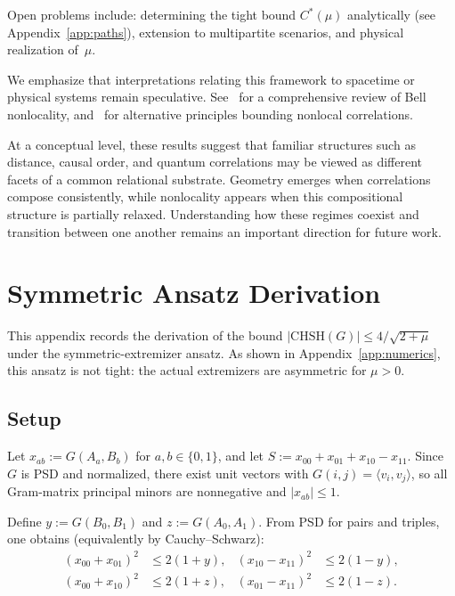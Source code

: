 \documentclass[11pt,a4paper]{article}
\theoremstyle{definition}
\theoremstyle{remark}
\newcommand{\CHSH}{\mathrm{CHSH}}
\newcommand{\ip}[2]{\langle #1, #2 \rangle}
\begin{document}
\noindent Open problems include: determining the tight bound $C^*(\mu)$ analytically (see Appendix~\ref{app:paths}), extension to multipartite scenarios, and physical realization of~$\mu$.

We emphasize that interpretations relating this framework to spacetime or physical systems remain speculative. See~\cite{brunner2014} for a comprehensive review of Bell nonlocality, and~\cite{pawlowski2009,carmi2019,grothendieck2006} for alternative principles bounding nonlocal correlations.

At a conceptual level, these results suggest that familiar structures such as distance, causal order, and quantum correlations may be viewed as different facets of a common relational substrate. Geometry emerges when correlations compose consistently, while nonlocality appears when this compositional structure is partially relaxed. Understanding how these regimes coexist and transition between one another remains an important direction for future work.


\appendix

\section{Symmetric Ansatz Derivation}\label{app:proof}

This appendix records the derivation of the bound $|\CHSH(G)| \le 4/\sqrt{2+\mu}$ under the symmetric-extremizer ansatz. As shown in Appendix~\ref{app:numerics}, this ansatz is not tight: the actual extremizers are asymmetric for $\mu > 0$.

\subsection{Setup}

Let $x_{ab} := G(A_a,B_b)$ for $a,b \in \{0,1\}$, and let $S := x_{00}+x_{01}+x_{10}-x_{11}$. Since~$G$ is PSD and normalized, there exist unit vectors with $G(i,j) = \ip{v_i}{v_j}$, so all Gram-matrix principal minors are nonnegative and $|x_{ab}| \le 1$.

Define $y := G(B_0,B_1)$ and $z := G(A_0,A_1)$. From PSD for pairs and triples, one obtains (equivalently by Cauchy--Schwarz):
\begin{align}
(x_{00}+x_{01})^2 &\le 2(1+y), & (x_{10}-x_{11})^2 &\le 2(1-y), \label{eq:psd-y}\\
(x_{00}+x_{10})^2 &\le 2(1+z), & (x_{01}-x_{11})^2 &\le 2(1-z). \label{eq:psd-z}
\end{align}
\end{document}
